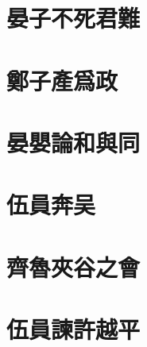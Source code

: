 \documentclass{article}
\begin{document}
\section{晏子不死君難}

\section{鄭子產爲政}

\section{晏嬰論和與同}

\section{伍員奔吴}

\section{齊魯夾谷之會}

\section{伍員諫許越平}
\end{document}
